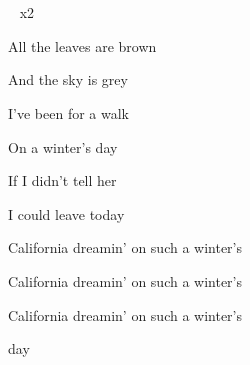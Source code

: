 \begin{song}
\bigskip

   \textbar\    \par
{}    \textbar\   \par
{}    \textbar\   x2 \par

\bigskip

All the leaves are brown   \par
And the sky is grey  \par
I've been for a walk   \par
On a winter's day  \par
If I didn’t tell her   \par
I could leave today  \par

\bigskip

California dreamin’   on such a winter's \par
{} California dreamin’   on such a winter's \par
{} California dreamin’   on such a winter's \par
{} day \par
{} \par

\end{song}
